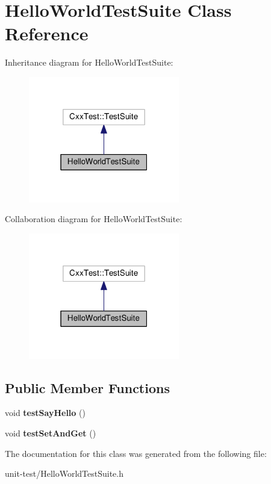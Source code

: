 \hypertarget{classHelloWorldTestSuite}{}\section{Hello\+World\+Test\+Suite Class Reference}
\label{classHelloWorldTestSuite}


Inheritance diagram for Hello\+World\+Test\+Suite\+:
\nopagebreak
\begin{figure}[H]
\begin{center}
\leavevmode
\includegraphics[width=187pt]{classHelloWorldTestSuite__inherit__graph}
\end{center}
\end{figure}


Collaboration diagram for Hello\+World\+Test\+Suite\+:
\nopagebreak
\begin{figure}[H]
\begin{center}
\leavevmode
\includegraphics[width=187pt]{classHelloWorldTestSuite__coll__graph}
\end{center}
\end{figure}
\subsection*{Public Member Functions}
\begin{DoxyCompactItemize}
\item 
void {\bfseries test\+Say\+Hello} ()\hypertarget{classHelloWorldTestSuite_ab531f9bcf51ce3fcba23df392e850104}{}\label{classHelloWorldTestSuite_ab531f9bcf51ce3fcba23df392e850104}

\item 
void {\bfseries test\+Set\+And\+Get} ()\hypertarget{classHelloWorldTestSuite_a0f6e1f66faded34b0a99d1fb00ac758a}{}\label{classHelloWorldTestSuite_a0f6e1f66faded34b0a99d1fb00ac758a}

\end{DoxyCompactItemize}


The documentation for this class was generated from the following file\+:\begin{DoxyCompactItemize}
\item 
unit-\/test/Hello\+World\+Test\+Suite.\+h\end{DoxyCompactItemize}
